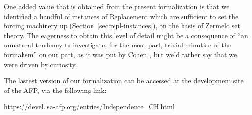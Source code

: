 One added value that is obtained from the present formalization is
that we identified a handful of instances of Replacement which are
sufficient to set the forcing machinery up
(Section~\ref{sec:repl-instances}), on the basis of Zermelo set theory.
The eagerness to obtain this level of detail might be a consequence of
“an unnatural tendency to investigate, for the most part, trivial
minutiae of the formalism” on our part, as it was put by Cohen
\cite{zbMATH02012060}, but we'd rather say that we were driven by
curiosity.

The lastest version of our formalization can be accessed at the
development site of the AFP, via the following link:
\begin{center}
  \url{https://devel.isa-afp.org/entries/Independence_CH.html}
\end{center}
